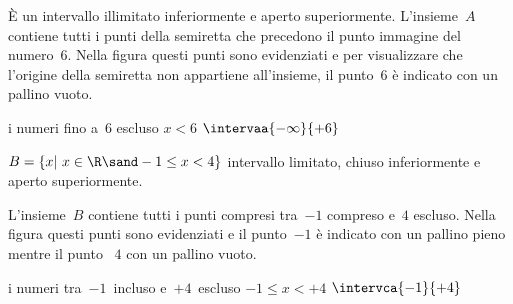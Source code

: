 {\begin{esempio}
È un intervallo illimitato inferiormente e aperto superiormente.
L'insieme~\(A\) contiene tutti i punti della
semiretta che precedono il punto immagine del numero~\(6\). 
Nella figura questi punti sono evidenziati e 
per visualizzare che l'origine della semiretta non
appartiene all'insieme, il punto~\(6\) è indicato con un pallino vuoto.

\eseminter
{i numeri fino a~\(6\) escluso}
{\(x < 6\)}
{\(\intervaa{-\infty}{+6}\)}
{}

\end{esempio}

\begin{esempio}
\(B=\{x|~x \in \R \sand -1 \le x < 4\}\) intervallo limitato, 
chiuso inferiormente e aperto superiormente.

L'insieme~\(B\) contiene tutti i punti compresi tra~\(-1\) compreso 
e~\(4\) escluso. 
Nella figura questi punti sono evidenziati e il punto~\(-1\) è 
indicato con un pallino pieno mentre il punto ~\(4\) con un pallino vuoto.

\eseminter
{i numeri tra~\(-1\)~incluso e~\(+4\)~escluso}
{\(-1 \le x < +4\)}
{\(\intervca{-1}{+4}\)}
{}
\end{esempio}

}
